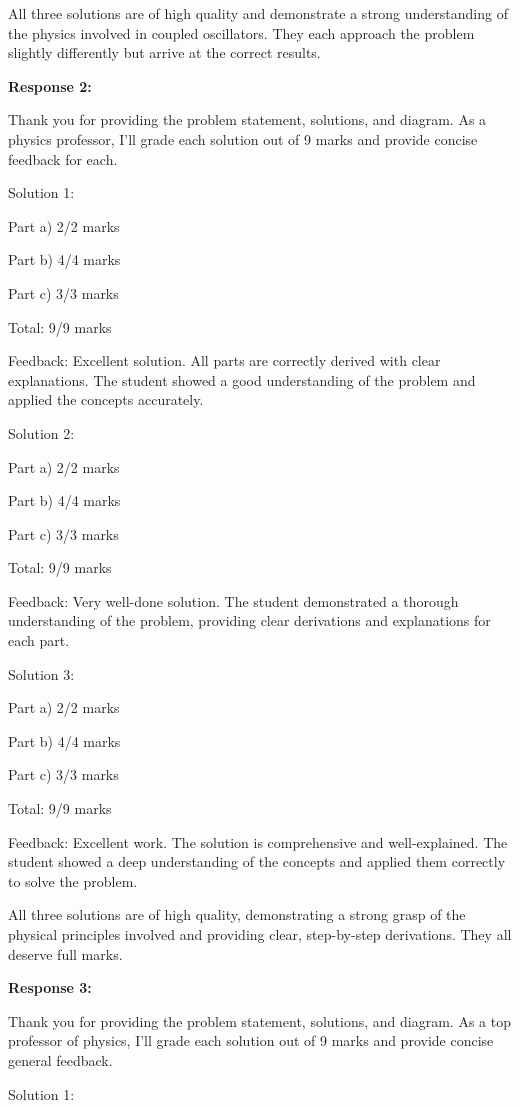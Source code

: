 \documentclass[a4paper,11pt]{article}
\begin{document}
All three solutions are of high quality and demonstrate a strong understanding of the physics involved in coupled oscillators. They each approach the problem slightly differently but arrive at the correct results.

\bigskip    
\textbf{Response 2:}

Thank you for providing the problem statement, solutions, and diagram. As a physics professor, I'll grade each solution out of 9 marks and provide concise feedback for each.

Solution 1:

Part a) 2/2 marks

Part b) 4/4 marks

Part c) 3/3 marks

Total: 9/9 marks

Feedback: Excellent solution. All parts are correctly derived with clear explanations. The student showed a good understanding of the problem and applied the concepts accurately.

Solution 2:

Part a) 2/2 marks

Part b) 4/4 marks

Part c) 3/3 marks

Total: 9/9 marks

Feedback: Very well-done solution. The student demonstrated a thorough understanding of the problem, providing clear derivations and explanations for each part.

Solution 3:

Part a) 2/2 marks

Part b) 4/4 marks

Part c) 3/3 marks

Total: 9/9 marks

Feedback: Excellent work. The solution is comprehensive and well-explained. The student showed a deep understanding of the concepts and applied them correctly to solve the problem.

All three solutions are of high quality, demonstrating a strong grasp of the physical principles involved and providing clear, step-by-step derivations. They all deserve full marks.

\bigskip    
\textbf{Response 3:}

Thank you for providing the problem statement, solutions, and diagram. As a top professor of physics, I'll grade each solution out of 9 marks and provide concise general feedback.

Solution 1:
\end{document}
